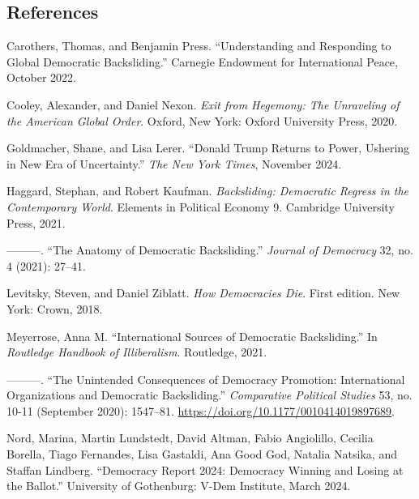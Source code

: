 \documentclass[
  letterpaper,
  DIV=11,
  numbers=noendperiod]{scrartcl}
\newlength{\cslhangindent}
\newenvironment{CSLReferences}[2] %
 {\begin{list}{}{%
  \setlength{\itemindent}{0pt}
  \setlength{\leftmargin}{0pt}
  \setlength{\parsep}{0pt}
  \ifodd #1
   \setlength{\leftmargin}{\cslhangindent}
   \setlength{\itemindent}{-1\cslhangindent}
  \fi
  \setlength{\itemsep}{#2\baselineskip}}}
 {\end{list}}
\begin{document}
\subsection{References}\label{references}

\label{refs}
\begin{CSLReferences}{1}{0}
Carothers, Thomas, and Benjamin Press. {``Understanding and {Responding}
to {Global Democratic Backsliding}.''} Carnegie Endowment for
International Peace, October 2022.

Cooley, Alexander, and Daniel Nexon. \emph{Exit from {Hegemony}: {The
Unraveling} of the {American Global Order}}. Oxford, New York: Oxford
University Press, 2020.

Goldmacher, Shane, and Lisa Lerer. {``Donald {Trump Returns} to {Power},
{Ushering} in {New Era} of {Uncertainty}.''} \emph{The New York Times},
November 2024.

Haggard, Stephan, and Robert Kaufman. \emph{Backsliding: {Democratic
Regress} in the {Contemporary World}}. Elements in {Political Economy}
9. Cambridge University Press, 2021.

---------. {``The {Anatomy} of {Democratic Backsliding}.''}
\emph{Journal of Democracy} 32, no. 4 (2021): 27--41.

Levitsky, Steven, and Daniel Ziblatt. \emph{How {Democracies Die}}.
First edition. New York: Crown, 2018.

Meyerrose, Anna M. {``International {Sources} of {Democratic
Backsliding}.''} In \emph{Routledge {Handbook} of {Illiberalism}}.
Routledge, 2021.

---------. {``The {Unintended Consequences} of {Democracy Promotion}:
{International Organizations} and {Democratic Backsliding}.''}
\emph{Comparative Political Studies} 53, no. 10-11 (September 2020):
1547--81. \url{https://doi.org/10.1177/0010414019897689}.

Nord, Marina, Martin Lundstedt, David Altman, Fabio Angiolillo, Cecilia
Borella, Tiago Fernandes, Lisa Gastaldi, Ana Good God, Natalia Natsika,
and Staffan Lindberg. {``Democracy {Report} 2024: {Democracy Winning}
and {Losing} at the {Ballot}.''} University of Gothenburg: V-Dem
Institute, March 2024.

\end{CSLReferences}
\end{document}

